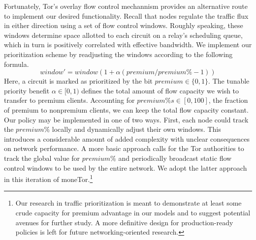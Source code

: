 Fortunately, Tor's overlay flow control mechannism provides an alternative route
to implement our desired functionality. Recall that nodes regulate the traffic
flux in either direction using a set of flow control windows. Roughly speaking,
these windows determine space allotted to each circuit on a relay's scheduling
queue, which in turn is positively correlated with effective bandwidth. We
implement our prioritization scheme by readjusting the windows according to the
following formula.
\begin{equation}
  window' = window(1+ \alpha(premium / premium\% - 1))
  \label{eq:flow}
\end{equation}
Here, a circuit is marked as prioritized by the bit $premium \in \{0, 1\}$. The
tunable priority benefit $\alpha \in [0, 1)$ defines the total amount of flow
capacity we wish to transfer to premium clients. Accounting for
$premium\%s \in [0,100]$, the fraction of premium to nonpremium clients, we can
keep the total flow capacity constant. Our policy may be implemented in one of
two ways. First, each node could track the $premium\%$ locally and dynamically
adjust their own windows. This introduces a considerable amount of added
complexity with unclear consequences on network performance. A more basic
approach calls for the Tor authorities to track the global value for $premium\%$
and periodically broadcast static flow control windows to be used by the entire
network. We adopt the latter approach in this iteration of moneTor.\footnote{Our
  research in traffic prioritization is meant to demonstrate at least some crude
  capacity for premium advantage in our models and to suggest potential avenues
  for further study. A more definitive design for production-ready policies is
  left for future networking-oriented research.}
